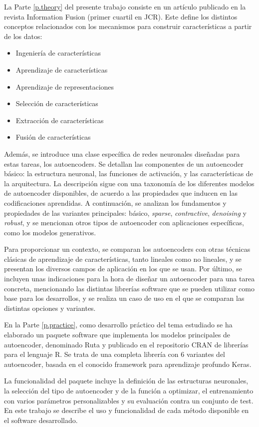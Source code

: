 \documentclass[oneside,openright,titlepage,numbers=noenddot,openany,headinclude,footinclude=true,
cleardoublepage=empty,abstractoff,BCOR=5mm,paper=a4,fontsize=12pt,main=spanish]{scrreprt}
\begin{document}
La Parte \ref{p.theory} del presente trabajo consiste en un artículo publicado en la revista Information Fusion (primer cuartil en JCR). Este define los distintos conceptos relacionados con los mecanismos para construir características a partir de los datos:
\begin{itemize}
\item Ingeniería de características
\item Aprendizaje de características
\item Aprendizaje de representaciones
\item Selección de características
\item Extracción de características
\item Fusión de características
\end{itemize}
Además, se introduce una clase específica de redes neuronales diseñadas para estas tareas, los autoencoders. Se detallan las componentes de un autoencoder básico: la estructura neuronal, las funciones de activación, y las características de la arquitectura. La descripción sigue con una taxonomía de los diferentes modelos de autoencoder disponibles, de acuerdo a las propiedades que inducen en las codificaciones aprendidas. A continuación, se analizan los fundamentos y propiedades de las variantes principales: básico, \textit{sparse}, \textit{contractive}, \textit{denoising} y \textit{robust}, y se mencionan otros tipos de autoencoder con aplicaciones específicas, como los modelos generativos.

Para proporcionar un contexto, se comparan los autoencoders con otras técnicas clásicas de aprendizaje de características, tanto lineales como no lineales, y se presentan los diversos campos de aplicación en los que se usan. Por último, se incluyen unas indicaciones para la hora de diseñar un autoencoder para una tarea concreta, mencionando las distintas librerías software que se pueden utilizar como base para los desarrollos, y se realiza un caso de uso en el que se comparan las distintas opciones y variantes.

En la Parte \ref{p.practice}, como desarrollo práctico del tema estudiado se ha elaborado un paquete software que implementa los modelos principales de autoencoder, denominado Ruta y publicado en el repositorio CRAN de librerías para el lenguaje R. Se trata de una completa librería con 6 variantes del autoencoder, basada en el conocido framework para aprendizaje profundo Keras.

La funcionalidad del paquete incluye la definición de las estructuras neuronales, la selección del tipo de autoencoder y de la función a optimizar, el entrenamiento con varios parámetros personalizables y su evaluación contra un conjunto de test. En este trabajo se describe el uso y funcionalidad de cada método disponible en el software desarrollado.
\end{document}
